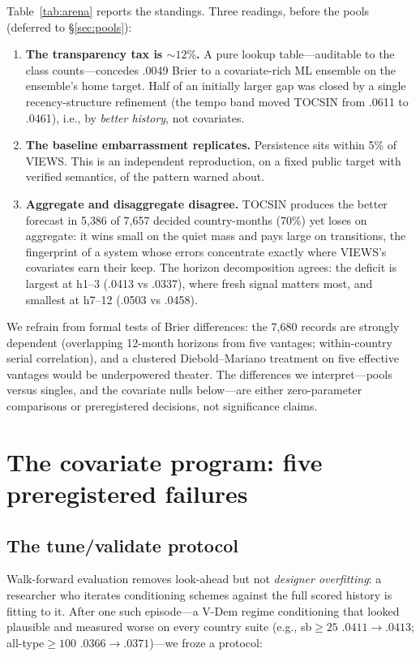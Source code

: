 \documentclass[11pt]{article}
\begin{document}
Table~\ref{tab:arena} reports the standings. Three readings, before the
pools (deferred to \S\ref{sec:pools}):

\begin{enumerate}
\item \textbf{The transparency tax is ${\sim}12\%$.} A pure lookup
table---auditable to the class counts---concedes .0049 Brier to a
covariate-rich ML ensemble on the ensemble's home target. Half of an
initially larger gap was closed by a single recency-structure refinement
(the tempo band moved TOCSIN from .0611 to .0461), i.e., by \emph{better
history}, not covariates.
\item \textbf{The baseline embarrassment replicates.} Persistence sits
within 5\% of VIEWS. This is an independent reproduction, on a fixed public
target with verified semantics, of the pattern \citet{cederman2017predicting}
warned about.
\item \textbf{Aggregate and disaggregate disagree.} TOCSIN produces the
better forecast in 5{,}386 of 7{,}657 decided country-months (70\%) yet loses
on aggregate: it wins small on the quiet mass and pays large on transitions,
the fingerprint of a system whose errors concentrate exactly where VIEWS's
covariates earn their keep. The horizon decomposition agrees: the deficit is
largest at h1--3 (.0413 vs .0337), where fresh signal matters most, and
smallest at h7--12 (.0503 vs .0458).
\end{enumerate}

We refrain from formal tests of Brier differences: the 7{,}680 records are
strongly dependent (overlapping 12-month horizons from five vantages;
within-country serial correlation), and a clustered Diebold--Mariano
treatment on five effective vantages would be underpowered theater. The
differences we interpret---pools versus singles, and the covariate nulls
below---are either zero-parameter comparisons or preregistered decisions,
not significance claims.

\section{The covariate program: five preregistered failures}\label{sec:covariates}

\subsection{The tune/validate protocol}\label{sec:protocol}

Walk-forward evaluation removes look-ahead but not \emph{designer
overfitting}: a researcher who iterates conditioning schemes against the
full scored history is fitting to it. After one such episode---a V-Dem
regime conditioning that looked plausible and measured worse on every
country suite (e.g., sb${\geq}25$ $.0411{\to}.0413$; all-type${\geq}100$
$.0366{\to}.0371$)---we froze a protocol:
\end{document}
